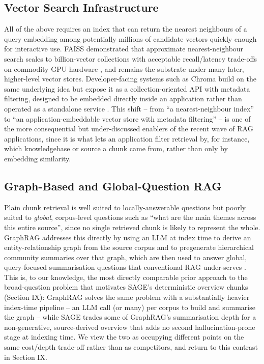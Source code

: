 \documentclass[conference]{IEEEtran}
\begin{document}
\subsection{Vector Search Infrastructure}
All of the above requires an index that can return the nearest neighbours
of a query embedding among potentially millions of candidate vectors
quickly enough for interactive use. FAISS demonstrated that approximate
nearest-neighbour search scales to billion-vector collections with
acceptable recall/latency trade-offs on commodity GPU hardware
\cite{johnson2017faiss}, and remains the substrate under many later,
higher-level vector stores. Developer-facing systems such as Chroma
build on the same underlying idea but expose it as a collection-oriented
API with metadata filtering, designed to be embedded directly inside an
application rather than operated as a standalone service
\cite{chroma2026docs}. This shift -- from ``a nearest-neighbour index'' to
``an application-embeddable vector store with metadata filtering'' -- is
one of the more consequential but under-discussed enablers of the recent
wave of RAG applications, since it is what lets an application filter
retrieval by, for instance, which knowledgebase or source a chunk came
from, rather than only by embedding similarity.

\subsection{Graph-Based and Global-Question RAG}
Plain chunk retrieval is well suited to locally-answerable questions but
poorly suited to \emph{global}, corpus-level questions such as ``what are
the main themes across this entire source'', since no single retrieved
chunk is likely to represent the whole. GraphRAG addresses this directly
by using an LLM at index time to derive an entity-relationship graph
from the source corpus and to pregenerate hierarchical community
summaries over that graph, which are then used to answer global,
query-focused summarisation questions that conventional RAG
under-serves \cite{edge2024graphrag}. This is, to our knowledge, the most
directly comparable prior approach to the broad-question problem that
motivates SAGE's deterministic overview chunks (Section IX): GraphRAG
solves the same problem with a substantially heavier index-time
pipeline -- an LLM call (or many) per corpus to build and summarise the
graph -- while SAGE trades some of GraphRAG's summarisation depth for a
non-generative, source-derived overview that adds no second
hallucination-prone stage at indexing time. We view the two as
occupying different points on the same cost/depth trade-off rather than
as competitors, and return to this contrast in Section IX.
\end{document}
